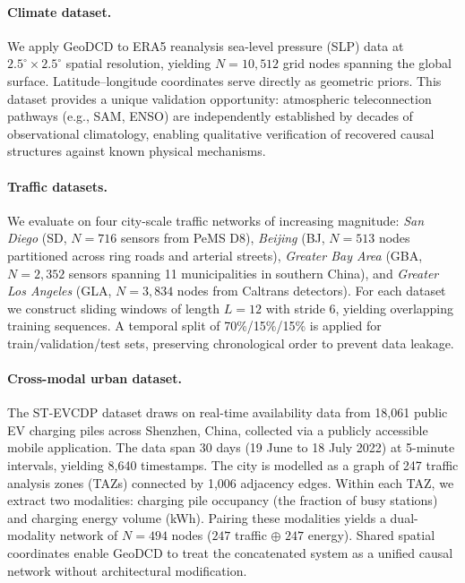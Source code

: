 \documentclass{article}
\begin{document}
\paragraph{Climate dataset.}
We apply GeoDCD to ERA5 reanalysis sea-level pressure (SLP) data at $2.5^\circ \times 2.5^\circ$ spatial resolution, yielding $N=10{,}512$ grid nodes spanning the global surface. Latitude--longitude coordinates serve directly as geometric priors. This dataset provides a unique validation opportunity: atmospheric teleconnection pathways (e.g., SAM, ENSO) are independently established by decades of observational climatology, enabling qualitative verification of recovered causal structures against known physical mechanisms.

\paragraph{Traffic datasets.}
We evaluate on four city-scale traffic networks of increasing magnitude: \textit{San Diego} (SD, $N=716$ sensors from PeMS D8), \textit{Beijing} (BJ, $N=513$ nodes partitioned across ring roads and arterial streets), \textit{Greater Bay Area} (GBA, $N=2{,}352$ sensors spanning 11 municipalities in southern China), and \textit{Greater Los Angeles} (GLA, $N=3{,}834$ nodes from Caltrans detectors). For each dataset we construct sliding windows of length $L=12$ with stride 6, yielding overlapping training sequences. A temporal split of 70\%/15\%/15\% is applied for train/validation/test sets, preserving chronological order to prevent data leakage.

\paragraph{Cross-modal urban dataset.}
The ST-EVCDP dataset draws on real-time availability data from 18,061 public EV charging piles across Shenzhen, China, collected via a publicly accessible mobile application. The data span 30 days (19 June to 18 July 2022) at 5-minute intervals, yielding 8,640 timestamps. The city is modelled as a graph of 247 traffic analysis zones (TAZs) connected by 1,006 adjacency edges. Within each TAZ, we extract two modalities: charging pile occupancy (the fraction of busy stations) and charging energy volume (kWh). Pairing these modalities yields a dual-modality network of $N=494$ nodes ($247$ traffic $\oplus$ $247$ energy). Shared spatial coordinates enable GeoDCD to treat the concatenated system as a unified causal network without architectural modification.
\end{document}
